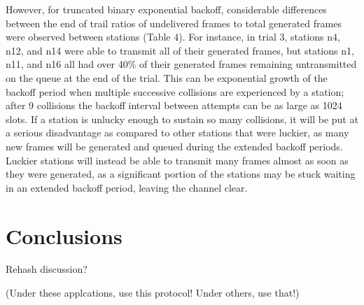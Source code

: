 \documentclass[twocolumn]{article}
\begin{document}
However, for truncated binary exponential backoff, considerable differences
between the end of trail ratios of undelivered frames to total generated frames
were observed between stations (Table 4). For instance, in trial 3, stations n4,
n12, and n14 were able to transmit all of their generated frames, but stations
n1, n11, and n16 all had over 40\% of their generated frames remaining
untransmitted on the queue at the end of the trial. This can be exponential
growth of the backoff period when multiple successive collisions are experienced
by a station; after 9 collisions the backoff interval between attempts can be as
large as 1024 slots. If a station is unlucky enough to sustain so many
collisions, it will be put at a serious disadvantage as compared to other
stations that were luckier, as many new frames will be generated and queued
during the extended backoff periods. Luckier stations will instead be able to transmit many
frames almost as soon as they were generated, as a significant portion of the stations
may be stuck waiting in an extended backoff period, leaving the channel clear.


\section*{Conclusions}

Rehash discussion?

(Under these applcations, use this protocol! Under others, use that!)

\end{document}
